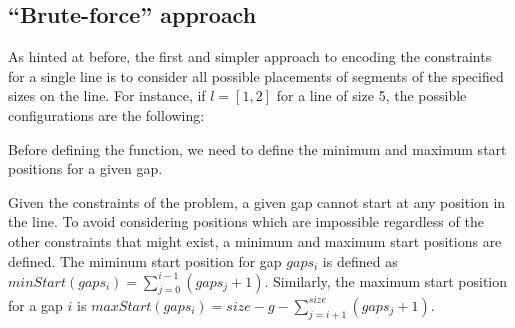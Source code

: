 \documentclass[12pt]{article}
\begin{document}
\subsection*{``Brute-force'' approach}

As hinted at before, the first and simpler approach to encoding the constraints for a single line is to consider all possible placements of segments of the specified sizes on the line.
For instance, if $l = [1, 2]$ for a line of size 5, the possible configurations are the following:

\begin{center}
\end{center}

\noindent Before defining the function, we need to define the minimum and maximum start positions for a given gap.

\noindent Given the constraints of the problem, a given gap cannot start at any position in the line.
To avoid considering positions which are impossible regardless of the other constraints that might exist, a minimum and maximum start positions are defined.
The miminum start position for gap $gaps_i$ is defined as $minStart(gaps_i) = \sum_{j = 0}^{i-1}(gaps_{j}+ 1)$. Similarly, the maximum start position for a gap $i$ is $maxStart(gaps_i) = size - g - \sum_{j=i+1}^{size}(gaps_{j} + 1)$.
\end{document}
